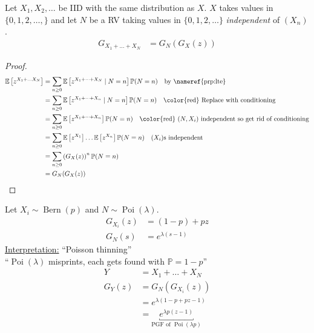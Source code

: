 \begin{proposition} \label{prp:randsum}
    Let $X_1, X_2, \dots$ be IID with the same distribution as $X$.
    $X$ takes values in $\{0, 1, 2, \dots,\}$ and let $N$ be a RV taking values in $\{0, 1, 2, \dots\}$ \emph{independent} of $(X_n)$.
    \begin{align*}
        G_{X_1 + \dots + X_N} &= G_N(G_X(z))
    \end{align*} 
\end{proposition} 

\begin{proof}
    \begin{align*}
        \mathbb{E}\left[z^{X_1 + \dots X_N}\right] &= \sum_{n \geq 0} \mathbb{E}\left[ z^{X_1 + \dots + X_N} \mid N = n \right] \mathbb{P}(N = n) \quad \text{by \nameref{prp:lte}} \\
        &= \sum_{n \geq 0} \mathbb{E}\left[ z^{X_1 + \dots + X_n} \mid N = n \right] \mathbb{P}(N = n) \quad \text{\color{red} Replace with conditioning} \\
        &= \sum_{n \geq 0} \mathbb{E}\left[ z^{X_1 + \dots + X_n} \right] \mathbb{P}(N = n) \quad \text{\color{red} $(N, X_i)$ independent so get rid of conditioning} \\
        &= \sum_{n \geq 0} \mathbb{E}\left[ z^{X_1} \right] \dots \mathbb{E}\left[ z^{X_n} \right] \mathbb{P}(N = n) \quad \text{$(X_i)$s independent} \\
        &= \sum_{n \geq 0} \left( G_X(z) \right)^n \mathbb{P}(N = n) \\
        &= G_N(G_X(z))
    \end{align*} 
\end{proof} 

\begin{example}
    Let $X_i \sim \operatorname{Bern}(p)$ and $N \sim \operatorname{Poi}(\lambda)$.
    \begin{align*}
        G_{X_i}(z) &= (1 - p) + pz \\
        G_N(s) &= e^{\lambda (s - 1)}
    \end{align*}  
    \color{blue} \underline{Interpretation:} ``Poisson thinning'' \\
    \color{red} ``$\operatorname{Poi}(\lambda)$ misprints, each gets found with $\mathbb{P} = 1-p$'' \color{black}
    \begin{align*}
        Y &= X_1 + \dots + X_N \\
        G_Y(z) &= G_N(G_{X_i}(z)) \\
        &= e^{\lambda (1 - p + pz - 1)} \\
        &= \underbracket{e^{\lambda p(z - 1)}}_{\text{PGF of $\operatorname{Poi}(\lambda p)$}}
    \end{align*} 
\end{example} 

